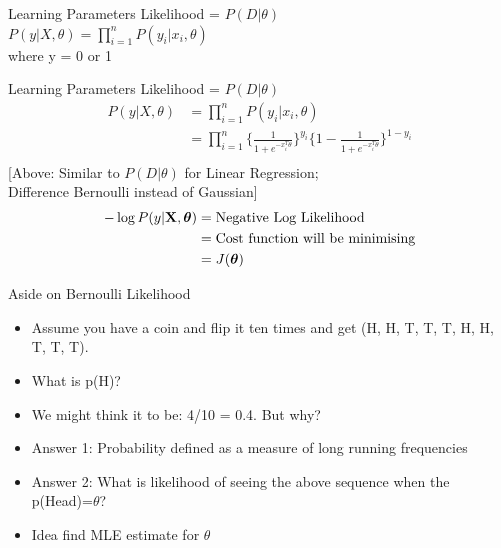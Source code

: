 \documentclass{beamer}
\begin{document}
\begin{frame}{Learning Parameters}
Likelihood = $P(D | \theta)$ \\
\vspace{0.2cm}
$P(y | X, \theta) = \prod_{i=1}^{n} P(y_{i} | x_{i}, \theta)$ \\ where y = 0 or 1
\end{frame}
\begin{frame}{Learning Parameters}
Likelihood = $P(D | \theta)$ \\
\vspace{-0.4cm}
\begin{align*}
P(y | X, \theta) &= \prod_{i=1}^{n} P(y_{i} | x_{i}, \theta) \\ &= \prod_{i=1}^{n} \Big\{\frac{1}{1 + e^{-x_{i}^{T}\theta}}\Big\}^{y_{i}}\Big\{1 - \frac{1}{1 + e^{-x_{i}^{T}\theta}}\Big\}^{1 - y_{i}} \\
\end{align*}
\vspace{0.2cm}
[Above: Similar to $P(D|\theta)$ for Linear Regression; \\
\hspace{1.3cm} Difference Bernoulli instead of Gaussian]\\
\begin{align*}
-\log P(y | \mathbf{X}, \boldsymbol{\theta}) &= \text{Negative Log Likelihood}\\ &= \text{Cost function will be minimising} \\ &= J(\boldsymbol{\theta})
\end{align*}
\end{frame}



\begin{frame}{Aside on Bernoulli Likelihood}
\begin{itemize}[<+->]
\item Assume you have a coin and flip it ten times and get (H, H, T, T, T, H, H, T, T, T).
\item What is p(H)?
\item We might think it to be: 4/10 = 0.4. But why?
\item Answer 1: Probability defined as a measure of long running frequencies
\item Answer 2: What is likelihood of seeing the above sequence when the p(Head)=$\theta$?
\item Idea find MLE estimate for $\theta$
\end{itemize}

\end{frame}
\end{document}
